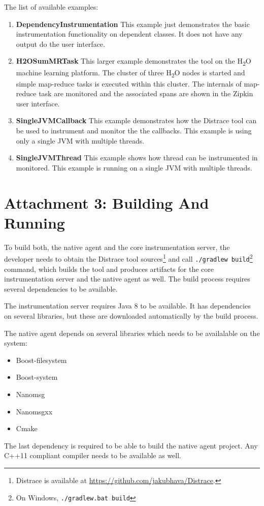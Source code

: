 \documentclass[12pt,a4paper]{report}
\begin{document}
The list of available examples:
\begin{enumerate}
	\item \textbf{DependencyInstrumentation} \newline
	This example just demonstrates the basic instrumentation functionality on dependent classes. It does not have any output do the user interface.
	\item \textbf{H2OSumMRTask} \newline
	This larger example demonstrates the tool on the H\textsubscript{2}O  machine learning platform. The cluster of three H\textsubscript{2}O  nodes is started and simple map-reduce tasks is executed within this cluster. The internals of map-reduce task are monitored and the associated spans are shown in the Zipkin user interface.
	\item \textbf{SingleJVMCallback} \newline
	This example demonstrates how the Distrace tool can be used to instrument and monitor the the callbacks. This example is using only a single JVM with multiple threads.
	\item \textbf{SingleJVMThread} \newline
	This example shows how thread can be instrumented in monitored. This example is running on a single JVM with multiple threads.
\end{enumerate}

\setcounter{page}{1}
\chapter*{Attachment 3: Building And Running}
To build both, the native agent and the core instrumentation server, the developer needs to obtain the Distrace tool sources\footnote{Distrace is available at \url{https://github.com/jakubhava/Distrace}.} and call \texttt{./gradlew build}\footnote{On Windows, \texttt{./gradlew.bat build}} command, which builds the tool and produces artifacts for the core instrumentation server and the native agent as well. The build process requires several dependencies to be available.

The instrumentation server requires Java 8 to be available. It has dependencies on several libraries, but these are downloaded automatically by the build process.

The native agent depends on several libraries which needs to be availalable on the system:
\begin{itemize}
	\item Boost-filesystem
	\item Boost-system
	\item Nanomsg
	\item Nanomsgxx
	\item Cmake
\end{itemize}
The last dependency is required to be able to build the native agent project. Any C++11 compliant compiler needs to be available as well.
\end{document}
